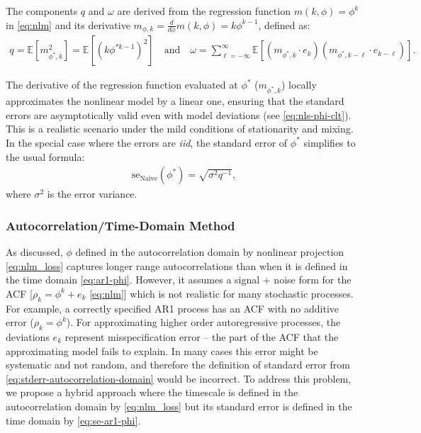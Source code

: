 \documentclass[docs/main.tex]{subfiles}
\begin{document}
\noindent The components $q$ and $\omega$ are derived from the regression function $m(k, \phi) = \phi^k$ in \eqref{eq:nlm} and its derivative $m_{\phi, k} = \frac{d}{d\phi} m(k, \phi) = k \phi^{k-1}$, defined as:
\begin{align}
    q = \mathbb{E}[m_{\phi^*, k}^2] = \mathbb{E}[(k \phi^{*k-1})^2] \quad\text{and}\quad
    \omega = \sum_{\ell=-\infty}^{\infty} \mathbb{E}[(m_{\phi^*, k} \cdot e_{k})(m_{\phi^*, k-\ell} \cdot e_{k-\ell})].
\end{align}

\noindent The derivative of the regression function evaluated at $\phi^*$ ($m_{\phi^*, k}$) locally approximates the nonlinear model by a linear one, ensuring that the standard errors are asymptotically valid even with model deviations (see \eqref{eq:nls-phi-clt}). This is a realistic scenario under the mild conditions of stationarity and mixing. In the special case where the errors are \textit{iid}, the standard error of $\phi^*$ simplifies to the usual formula:
\begin{align}
    \text{se}_{\text{Naive}}(\phi^*) = \sqrt{\sigma^2 q^{-1}},
\end{align}
\noindent where $\sigma^2$ is the error variance.

\subsubsection{Autocorrelation/Time-Domain Method}

As discussed, $\phi$ defined in the autocorrelation domain by nonlinear projection \eqref{eq:nlm_loss} captures longer range autocorrelations than when it is defined in the time domain \eqref{eq:ar1-phi}. However, it assumes a signal + noise form for the ACF [$\rho_k = \phi^k + e_k$ \eqref{eq:nlm}] which is not realistic for many stochastic processes. For example, a correctly specified AR1 process has an ACF with no additive error ($\rho_k=\phi^k$). For approximating higher order autoregressive processes, the deviations $e_k$ represent misspecification error -- the part of the ACF that the approximating model fails to explain. In many cases this error might be systematic and not random, and therefore the definition of standard error from \eqref{eq:stderr-autocorrelation-domain} would be incorrect. To address this problem, we propose a hybrid approach where the timescale is defined in the autocorrelation domain by \eqref{eq:nlm_loss} but its standard error is defined in the time domain by \eqref{eq:se-ar1-phi}.
\end{document}
